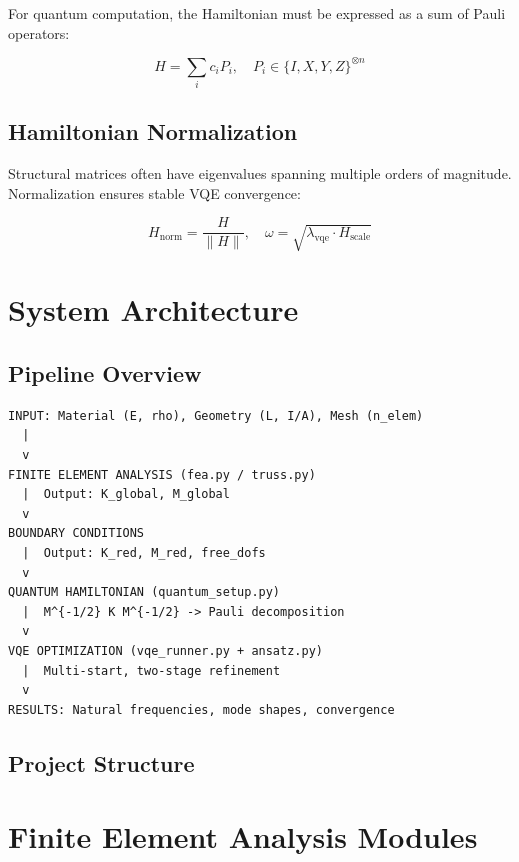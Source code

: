 \documentclass[12pt, a4paper]{article}
\begin{document}
For quantum computation, the Hamiltonian must be expressed as a sum of Pauli operators:

\begin{equation}
    H = \sum_i c_i P_i, \quad P_i \in \{I, X, Y, Z\}^{\otimes n}
\end{equation}

\subsection{Hamiltonian Normalization}

Structural matrices often have eigenvalues spanning multiple orders of magnitude. Normalization ensures stable VQE convergence:

\begin{equation}
    H_{\text{norm}} = \frac{H}{\|H\|}, \quad \omega = \sqrt{\lambda_{\text{vqe}} \cdot H_{\text{scale}}}
\end{equation}

\section{System Architecture}

\subsection{Pipeline Overview}

\begin{verbatim}
INPUT: Material (E, rho), Geometry (L, I/A), Mesh (n_elem)
  |
  v
FINITE ELEMENT ANALYSIS (fea.py / truss.py)
  |  Output: K_global, M_global
  v
BOUNDARY CONDITIONS
  |  Output: K_red, M_red, free_dofs
  v
QUANTUM HAMILTONIAN (quantum_setup.py)
  |  M^{-1/2} K M^{-1/2} -> Pauli decomposition
  v
VQE OPTIMIZATION (vqe_runner.py + ansatz.py)
  |  Multi-start, two-stage refinement
  v
RESULTS: Natural frequencies, mode shapes, convergence
\end{verbatim}

\subsection{Project Structure}



\section{Finite Element Analysis Modules}
\end{document}
